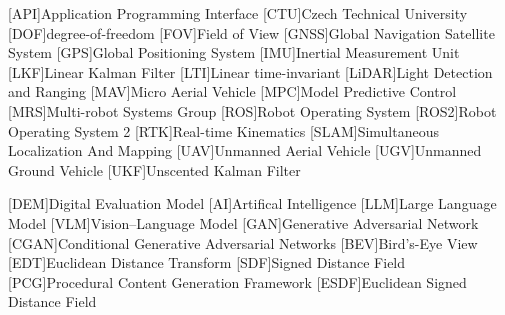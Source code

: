 
\begin{acronym}
  [API]{Application Programming Interface}
  [CTU]{Czech Technical University}
  [DOF]{degree-of-freedom}
  [FOV]{Field of View}
  [GNSS]{Global Navigation Satellite System}
  [GPS]{Global Positioning System}
  [IMU]{Inertial Measurement Unit}
  [LKF]{Linear Kalman Filter}
  [LTI]{Linear time-invariant}
  [LiDAR]{Light Detection and Ranging}
  [MAV]{Micro Aerial Vehicle}
  [MPC]{Model Predictive Control}
  [MRS]{Multi-robot Systems Group}
  [ROS]{Robot Operating System}
  [ROS2]{Robot Operating System 2}
  [RTK]{Real-time Kinematics}
  [SLAM]{Simultaneous Localization And Mapping}
  [UAV]{Unmanned Aerial Vehicle}
  [UGV]{Unmanned Ground Vehicle}
  [UKF]{Unscented Kalman Filter}
 
  [DEM]{Digital Evaluation Model}
  [AI]{Artifical Intelligence}
  [LLM]{Large Language Model} 
  [VLM]{Vision--Language Model}
  [GAN]{Generative Adversarial Network}
  [CGAN]{Conditional Generative Adversarial Networks}
  [BEV]{Bird's-Eye View}
  [EDT]{Euclidean Distance Transform}
  [SDF]{Signed Distance Field}
  [PCG]{Procedural Content Generation Framework}
  [ESDF]{Euclidean Signed Distance Field}
\end{acronym}

